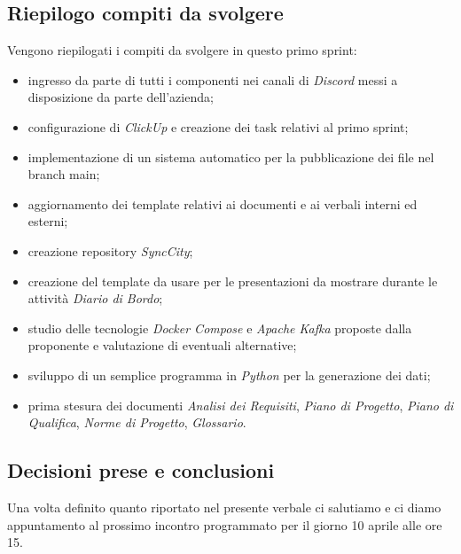 \documentclass[italian,12pt]{article}
\begin{document}
\subsection{Riepilogo compiti da svolgere}
Vengono riepilogati i compiti da svolgere in questo primo sprint:
\begin{itemize}
	\item ingresso da parte di tutti i componenti nei canali di \textit{Discord} messi a disposizione da parte dell'azienda;
	\item configurazione di \textit{ClickUp} e creazione dei task relativi al primo sprint;
	\item implementazione di un sistema automatico per la pubblicazione dei file nel branch main;
	\item aggiornamento dei template relativi ai documenti e ai verbali interni ed esterni;
	\item creazione repository \textit{SyncCity};
	\item creazione del template da usare per le presentazioni da mostrare durante le attività \textit{Diario di Bordo};
	\item studio delle tecnologie \textit{Docker Compose} e \textit{Apache Kafka} proposte dalla proponente e valutazione di eventuali alternative;
	\item sviluppo di un semplice programma in \textit{Python} per la generazione dei dati;
	\item prima stesura dei documenti \textit{Analisi dei Requisiti}, \textit{Piano di Progetto}, \textit{Piano di Qualifica}, \textit{Norme di Progetto}, \textit{Glossario}.
\end{itemize}

\subsection{Decisioni prese e conclusioni}
Una volta definito quanto riportato nel presente verbale ci salutiamo e ci diamo appuntamento al prossimo incontro programmato 
per il giorno 10 aprile alle ore 15.
\end{document}
